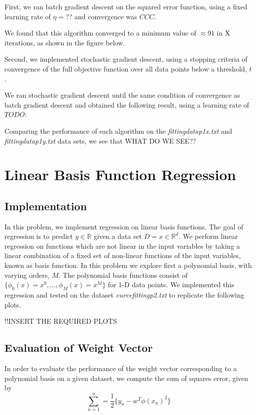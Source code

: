\documentclass[11pt]{article}
\newcommand{\?}[0]{\vert}
\begin{document}
 First, we ran batch gradient descent on the squared error function, using a fixed learning rate of $\eta = $?? and convergence was $CCC$.
 
 We found that this algorithm converged to a minimum value of $\approx 91$ in X iterations, as shown in the figure below.
 
 Second, we implemented stochastic gradient descent, using a stopping criteria of convergence of the full objective function over all data points below a threshold, $t$.
 
 We ran stochastic gradient descent until the same condition of convergence as batch gradient descent and obtained the following result, using a learning rate of $TODO$:
 
Comparing the performance of each algorithm on the  \textit{fittingdatap1x.txt} and \textit{fittingdatap1y.txt} data sets, we see that WHAT DO WE SEE??
 
 
\section{Linear Basis Function Regression}

\subsection{Implementation}
In this problem, we implement regression on linear basis functions. The goal of regression is to predict $y \in \mathbb{R}$ given a data set $D = x \in \mathbb{R}^{d}$. We perform linear regression on functions which are not linear in the input variables by taking a linear combination of a fixed set of non-linear functions of the input variables, known as basis function. In this problem we explore first a polynomial basis, with varying orders, $M$. The polynomial basis functions consist of $\{ \phi_0(x) = x^0, ... ,\phi_M(x) =x^M\}$ for 1-D data points. We implemented this regression and tested on the dataset \textit{curvefittingp2.txt} to replicate the following plots.

!!INSERT THE REQUIRED PLOTS

\subsection{Evaluation of Weight Vector}


In order to evaluate the performance of the weight vector corresponding to a polynomial basis on a given dataset, we compute the sum of squares error, given by 
$$ \sum_{n=1}^n = \frac{1}{2} \{y_n -w^T \phi(x_n)^2\} $$
\end{document}

